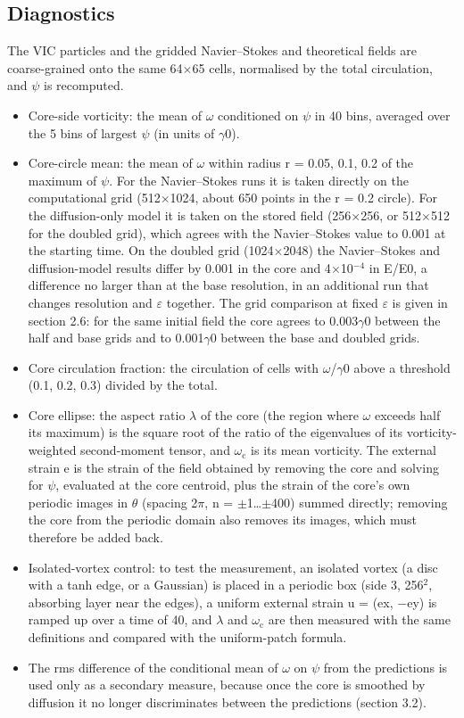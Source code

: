 \documentclass[11pt]{article}
\begin{document}
\subsection{Diagnostics}
The VIC particles and the gridded Navier--Stokes and theoretical fields are coarse-grained onto the same 64$\times{}$65 cells, normalised by the total circulation, and $\psi{}$ is recomputed.
\begin{itemize}
\item Core-side vorticity: the mean of $\omega{}$ conditioned on $\psi{}$ in 40 bins, averaged over the 5 bins of largest $\psi{}$ (in units of $\gamma{}$0).
\item Core-circle mean: the mean of $\omega{}$ within radius r = 0.05, 0.1, 0.2 of the maximum of $\psi{}$. For the Navier--Stokes runs it is taken directly on the computational grid (512$\times{}$1024, about 650 points in the r = 0.2 circle). For the diffusion-only model it is taken on the stored field (256$\times{}$256, or 512$\times{}$512 for the doubled grid), which agrees with the Navier--Stokes value to 0.001 at the starting time. On the doubled grid (1024$\times{}$2048) the Navier--Stokes and diffusion-model results differ by 0.001 in the core and 4$\times{}$10$^{-4}$ in E/E0, a difference no larger than at the base resolution, in an additional run that changes resolution and $\varepsilon{}$ together. The grid comparison at fixed $\varepsilon{}$ is given in section 2.6: for the same initial field the core agrees to 0.003$\gamma{}$0 between the half and base grids and to 0.001$\gamma{}$0 between the base and doubled grids.
\item Core circulation fraction: the circulation of cells with $\omega{}$/$\gamma{}$0 above a threshold (0.1, 0.2, 0.3) divided by the total.
\item Core ellipse: the aspect ratio $\lambda{}$ of the core (the region where $\omega{}$ exceeds half its maximum) is the square root of the ratio of the eigenvalues of its vorticity-weighted second-moment tensor, and $\omega{}_{\mathrm{c}}$ is its mean vorticity. The external strain e is the strain of the field obtained by removing the core and solving for $\psi{}$, evaluated at the core centroid, plus the strain of the core's own periodic images in $\theta{}$ (spacing 2$\pi{}$, n = $\pm{}$1\ldots{}$\pm{}$400) summed directly; removing the core from the periodic domain also removes its images, which must therefore be added back.
\item Isolated-vortex control: to test the measurement, an isolated vortex (a disc with a tanh edge, or a Gaussian) is placed in a periodic box (side 3, 256$^{2}$, absorbing layer near the edges), a uniform external strain u = (ex, $-$ey) is ramped up over a time of 40, and $\lambda{}$ and $\omega{}_{\mathrm{c}}$ are then measured with the same definitions and compared with the uniform-patch formula.
\item The rms difference of the conditional mean of $\omega{}$ on $\psi{}$ from the predictions is used only as a secondary measure, because once the core is smoothed by diffusion it no longer discriminates between the predictions (section 3.2).
\end{itemize}
\end{document}
